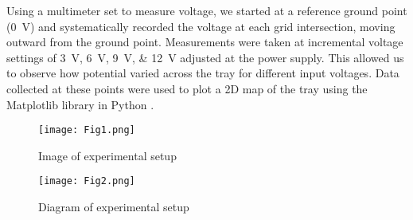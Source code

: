 \documentclass[10pt,journal,twoside]{IEEEtran}
\begin{document}
Using a multimeter set to measure voltage, we started at a reference ground point (\qty{0}{\volt}) and systematically recorded the voltage at each grid intersection, moving outward from the ground point. Measurements were taken at incremental voltage settings of \qtylist{3;6;9;12}{\volt} adjusted at the power supply. This allowed us to observe how potential varied across the tray for different input voltages. Data collected at these points were used to plot a 2D map of the tray using the Matplotlib library in Python \cite{harris2020array,Hunter:2007}.
\begin{figure}
\centering
\begin{minipage}{0.50\columnwidth}
    \texttt{[image: Fig1.png]}
    \caption{Image of experimental setup}
    \label{fig:setup}
\end{minipage}\hfill
\begin{minipage}{0.50\columnwidth}
    \texttt{[image: Fig2.png]}
    \caption{Diagram of experimental setup}
    \label{fig:diagram}
\end{minipage}
\end{figure}
\end{document}
